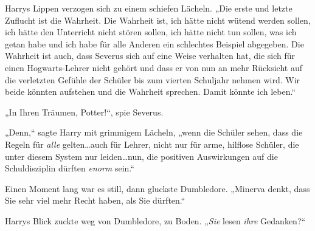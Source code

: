 Harrys Lippen verzogen sich zu einem schiefen Lächeln. „Die erste und letzte Zuflucht ist die Wahrheit. Die Wahrheit ist, ich hätte nicht wütend werden sollen, ich hätte den Unterricht nicht stören sollen, ich hätte nicht tun sollen, was ich getan habe und ich habe für alle Anderen ein schlechtes Beispiel abgegeben. Die Wahrheit ist auch, dass Severus sich auf eine Weise verhalten hat, die sich für einen Hogwarts-Lehrer nicht gehört und dass er von nun an mehr Rücksicht auf die verletzten Gefühle der Schüler bis zum vierten Schuljahr nehmen wird. Wir beide könnten aufstehen und die Wahrheit sprechen. Damit könnte ich leben.“

„In Ihren Träumen, Potter!“, spie Severus.

„Denn,“ sagte Harry mit grimmigem Lächeln, „wenn die Schüler sehen, dass die Regeln für \emph{alle} gelten…auch für Lehrer, nicht nur für arme, hilflose Schüler, die unter diesem System nur leiden…nun, die positiven Auswirkungen auf die Schuldisziplin dürften \emph{enorm} sein.“

Einen Moment lang war es still, dann gluckste Dumbledore. „Minerva denkt, dass Sie sehr viel mehr Recht haben, als Sie dürften.“

Harrys Blick zuckte weg von Dumbledore, zu Boden. „\emph{Sie} lesen \emph{ihre} Gedanken?“

